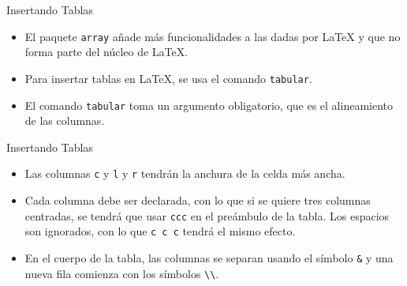 \documentclass[12pt]{beamer}
\begin{document}
\begin{frame}{Insertando Tablas}
  \begin{itemize}
    \item<1-> El paquete \texttt{\color{blue}array} añade más funcionalidades a las dadas por \LaTeX{} y que no forma parte del núcleo de \LaTeX{}.
    \item<2-> Para insertar tablas en \LaTeX, se usa el comando \texttt{\color{blue}tabular}.
    \item<3-> El comando \texttt{\color{blue}tabular} toma un argumento obligatorio, que es el alineamiento de las columnas.
  \end{itemize}
\end{frame}
\begin{frame}{Insertando Tablas}
  \begin{itemize}
    \item<1-> Las columnas \texttt{\color{blue}c} y \texttt{\color{blue}l} y \texttt{\color{blue}r} tendrán la anchura de la celda más ancha.
    \item<2-> Cada columna debe ser declarada, con lo que si se quiere tres columnas centradas, se tendrá que usar \texttt{\color{blue}ccc} en el preámbulo de la tabla. Los espacios son ignorados, con lo que \texttt{\color{blue}c c c} tendrá el mismo efecto.
    \item <3-> En el cuerpo de la tabla, las columnas se separan usando el símbolo \texttt{\color{blue}\&} y una nueva fila comienza con los símbolos \texttt{\color{blue}\textbackslash\textbackslash}.
  \end{itemize}
\end{frame}
\end{document}
